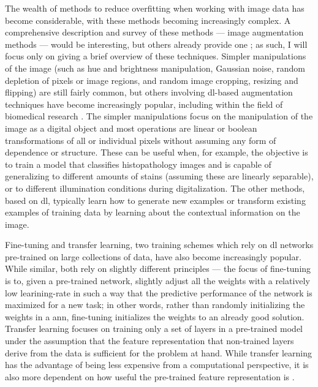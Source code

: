 The wealth of methods to reduce overfitting when working with image data has become considerable, with these methods becoming increasingly complex. A comprehensive description and survey of these methods --- image augmentation methods --- would be interesting, but others already provide one \cite{Shorten2019-hr}; as such, I will focus only on giving a brief overview of these techniques. Simpler manipulations of the image (such as hue and brightness manipulation, Gaussian noise, random depletion of pixels or image regions, and random image cropping, resizing and flipping) are still fairly common, but others involving \ac{dl}-based augmentation techniques have become increasingly popular, including within the field of biomedical research \cite{Shorten2019-hr}. The simpler manipulations focus on the manipulation of the image as a digital object and most operations are linear or boolean transformations of all or individual pixels without assuming any form of dependence or structure. These can be useful when, for example, the objective is to train a model that classifies histopathology images and is capable of generalizing to different amounts of stains (assuming these are linearly separable), or to different illumination conditions during digitalization. The other methods, based on \ac{dl}, typically learn how to generate new examples or transform existing examples of training data by learning about the contextual information on the image.

Fine-tuning and transfer learning, two training schemes which rely on \ac{dl} networks pre-trained on large collections of data, have also become increasingly popular. While similar, both rely on slightly different principles --- the focus of fine-tuning is to, given a pre-trained network, slightly adjust all the weights with a relatively low learining-rate in such a way that the predictive performance of the network is maximized for a new task; in other words, rather than randomly initializing the weights in a \ac{ann}, fine-tuning initializes the weights to an already good solution. Transfer learning focuses on training only a set of layers in a pre-trained model under the assumption that the feature representation that non-trained layers derive from the data is sufficient for the problem at hand. While transfer learning has the advantage of being less expensive from a computational perspective, it is also more dependent on how useful the pre-trained feature representation is \cite{transfer-learning-fine-tuning}. 

